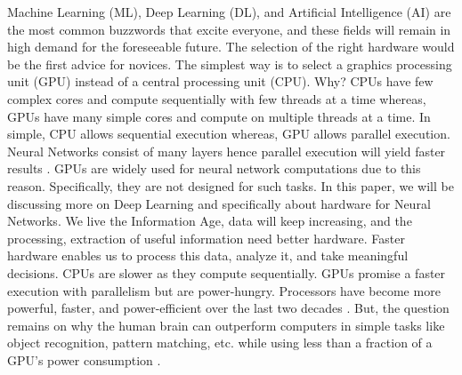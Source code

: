 \documentclass[11pt,twoside]{article}
\begin{document}
Machine Learning (ML), Deep Learning (DL), and Artificial Intelligence (AI) are the most common buzzwords that excite everyone, and these fields will remain in high demand for the foreseeable future. The selection of the right hardware would be the first advice for novices. The simplest way is to select a graphics processing unit (GPU) instead of a central processing unit (CPU). Why? CPUs have few complex cores and compute sequentially with few threads at a time whereas, GPUs have many simple cores and compute on multiple threads at a time. In simple, CPU allows sequential execution whereas, GPU allows parallel execution. Neural Networks consist of many layers hence parallel execution will yield faster results \cite{cronin2020fully}. GPUs are widely used for neural network computations due to this reason. Specifically, they are not designed for such tasks. In this paper, we will be discussing more on Deep Learning and specifically about hardware for Neural Networks. We live the Information Age, data will keep increasing, and the processing, extraction of useful information need better hardware\cite{jorgenson2005accounting, Hennessy_Patterson_2017}. Faster hardware enables us to process this data, analyze it, and take meaningful decisions. CPUs are slower as they compute sequentially. GPUs promise a faster execution with parallelism but are power-hungry. Processors have become more powerful, faster, and power-efficient over the last two decades \cite{Hennessy_Patterson_2017}. But, the question remains on why the human brain can outperform computers in simple tasks like object recognition, pattern matching, etc. while using less than a fraction of a GPU's power consumption \cite{hsu2009much, modha2017introducing}.
\par
\end{document}
